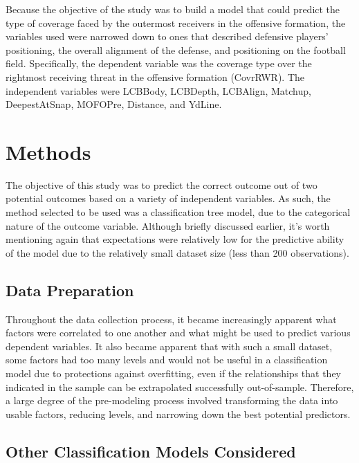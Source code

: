 \documentclass{article}
\begin{document}
	Because the objective of the study was to build a model that could predict the type of coverage faced by the outermost receivers in the offensive formation, the variables used were narrowed down to ones that described defensive players’ positioning, the overall alignment of the defense, and positioning on the football field. Specifically, the dependent variable was the coverage type over the rightmost receiving threat in the offensive formation (CovrRWR). The independent variables were LCBBody, LCBDepth, LCBAlign, Matchup, DeepestAtSnap, MOFOPre, Distance, and YdLine. 


\section{Methods}





	The objective of this study was to predict the correct outcome out of two potential outcomes based on a variety of independent variables. As such, the method selected to be used was a classification tree model, due to the categorical nature of the outcome variable. Although briefly discussed earlier, it’s worth mentioning again that expectations were relatively low for the predictive ability of the model due to the relatively small dataset size (less than 200 observations). 
	
\subsection{Data Preparation}

	Throughout the data collection process, it became increasingly apparent what factors were correlated to one another and what might be used to predict various dependent variables. It also became apparent that with such a small dataset, some factors had too many levels and would not be useful in a classification model due to protections against overfitting, even if the relationships that they indicated in the sample can be extrapolated successfully out-of-sample. Therefore, a large degree of the pre-modeling process involved transforming the data into usable factors, reducing levels, and narrowing down the best potential predictors. 

\subsection{Other Classification Models Considered}
\end{document}

